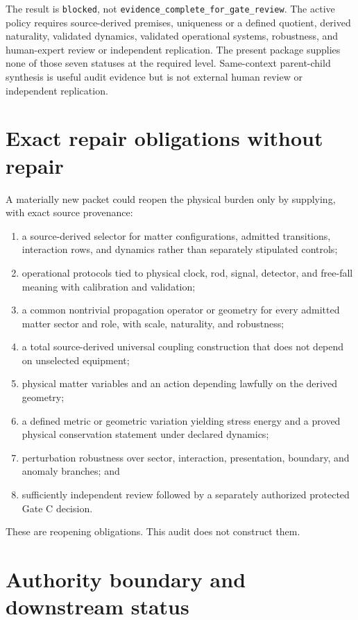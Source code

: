 \documentclass[11pt]{article}
\begin{document}
The result is \texttt{blocked}, not
\texttt{evidence\_complete\_for\_gate\_review}. The active policy requires
source-derived premises, uniqueness or a defined quotient, derived
naturality, validated dynamics, validated operational systems, robustness,
and human-expert review or independent replication. The present package
supplies none of those seven statuses at the required level. Same-context
parent-child synthesis is useful audit evidence but is not external human
review or independent replication.

\section{Exact repair obligations without repair}

A materially new packet could reopen the physical burden only by supplying,
with exact source provenance:
\begin{enumerate}[leftmargin=*]
\item a source-derived selector for matter configurations, admitted
transitions, interaction rows, and dynamics rather than separately stipulated
controls;
\item operational protocols tied to physical clock, rod, signal, detector,
and free-fall meaning with calibration and validation;
\item a common nontrivial propagation operator or geometry for every admitted
matter sector and role, with scale, naturality, and robustness;
\item a total source-derived universal coupling construction that does not
depend on unselected equipment;
\item physical matter variables and an action depending lawfully on the
derived geometry;
\item a defined metric or geometric variation yielding stress energy and a
proved physical conservation statement under declared dynamics;
\item perturbation robustness over sector, interaction, presentation,
boundary, and anomaly branches; and
\item sufficiently independent review followed by a separately authorized
protected Gate C decision.
\end{enumerate}

These are reopening obligations. This audit does not construct them.

\section{Authority boundary and downstream status}
\end{document}
